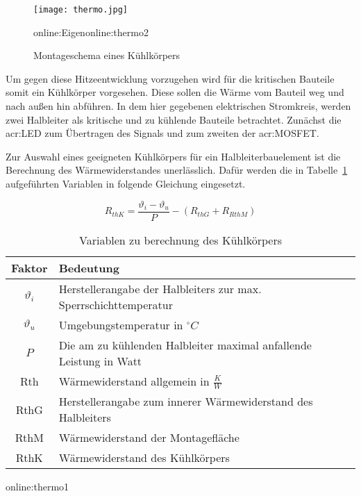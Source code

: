\begin{figure}[H]
	\centering
	\texttt{[image: thermo.jpg]}
	\caption[Montageschema eines Kühlkörpers]{Montageschema eines Kühlkörpers} \gls{online:Eigen}\gls{online:thermo2}
	\label{fig:thermo}
\end{figure}

Um gegen diese Hitzeentwicklung vorzugehen wird für die kritischen Bauteile somit ein Kühlkörper vorgesehen. Diese sollen die Wärme vom Bauteil weg und nach außen hin abführen. In dem hier gegebenen elektrischen Stromkreis, werden zwei Halbleiter als kritische und zu kühlende Bauteile betrachtet. Zunächst die \gls{acr:LED} zum Übertragen des Signals und zum zweiten der \gls{acr:MOSFET}.\cite{thermLED}

Zur Auswahl eines geeigneten Kühlkörpers für ein Halbleiterbauelement ist die Berechnung des Wärmewiderstandes unerlässlich. Dafür werden die in Tabelle~\ref{tab:thermofaktoren} aufgeführten Variablen in folgende Gleichung eingesetzt.

\begin{equation}
	\label{equ:thermo}
	R_{thK} = \frac{\vartheta_{i}-\vartheta_{u}}{P}-(R_{thG}+R_{RthM})
\end{equation}

\begin{table}[htb]
	\begin{center}
		\begin{tabular}[h]{cl}	
			\toprule
			Faktor & Bedeutung \\
			\midrule
			$\vartheta_{i}$& Herstellerangabe der Halbleiters zur max. Sperrschichttemperatur\\
			$\vartheta_{u}$& Umgebungstemperatur in $^\circ C$ \\
			$P$ &  Die am zu kühlenden Halbleiter maximal anfallende Leistung in Watt\\
			Rth & Wärmewiderstand allgemein in $\frac{K}{W}$ \\
			RthG & Herstellerangabe zum innerer Wärmewiderstand des Halbleiters \\
			RthM & Wärmewiderstand der Montagefläche \\
			RthK &  Wärmewiderstand des Kühlkörpers \\
			\bottomrule
		\end{tabular}
		\caption{Variablen zu berechnung des Kühlkörpers}\gls{online:thermo1}
		\label{tab:thermofaktoren}
	\end{center}
\end{table}

